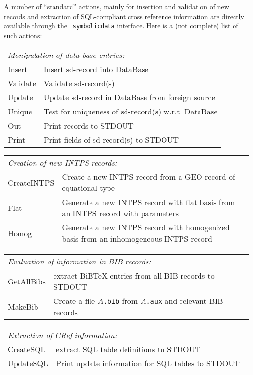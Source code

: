 \documentclass[11pt]{article}
\begin{document}
A number of ``standard'' actions, mainly for insertion and
validation of new records and extraction of SQL-compliant cross
reference information are directly available through the {\tt
symbolicdata} interface.  Here is a (not complete) list of such
actions: 
\begin{center}
\begin{tabular}{p{2.5cm}p{8.7cm}}
\multicolumn{2}{l}{\it Manipulation of data base entries:}\\[6pt]
 Insert        &  Insert sd-record into DataBase\\
 Validate      &  Validate sd-record(s)\\
 Update        &  Update sd-record in DataBase from foreign
 source\\ 
 Unique        &  Test for uniqueness of sd-record(s)
 w.r.t. DataBase\\ 
 Out           &  Print records to STDOUT\\
 Print         &  Print fields of sd-record(s) to STDOUT\\
\end{tabular}\medskip

\begin{tabular}{p{2.5cm}p{8.7cm}}
\multicolumn{2}{l}{\it Creation of new INTPS records:}\\[6pt]
 CreateINTPS   &  Create a new INTPS record from a GEO record of
 equational type\\ 
 Flat          &  Generate a new INTPS record with flat basis from an 
INTPS record with parameters \\
 Homog         &  Generate a new INTPS record with homogenized basis
from an inhomogeneous INTPS record\\
\end{tabular}\medskip

\begin{tabular}{p{2.5cm}p{8.7cm}}
\multicolumn{2}{l}{\it Evaluation of information in BIB records:}\\[6pt]
 GetAllBibs    &  extract BiBTeX entries from all BIB records to
 STDOUT\\ 
 MakeBib       &  Create a file {\tt $A$.bib} from {\tt $A$.aux} and
 relevant BIB records\\
\end{tabular}\medskip

\begin{tabular}{p{2.5cm}p{8.7cm}}
\multicolumn{2}{l}{\it Extraction of CRef information:}\\[6pt]
 CreateSQL     &  extract SQL table definitions to STDOUT\\
 UpdateSQL     &  Print update information for SQL tables to
 STDOUT\\ 
\end{tabular}
\end{center}
\end{document}

